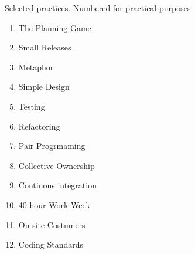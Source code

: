 Selected practices\citep{xp:explained}. Numbered for practical purposes

\begin{enumerate}
\item The Planning Game
\item Small Releases
\item Metaphor
\item Simple Design
\item Testing
\item Refactoring
\item Pair Progrmaming
\item Collective Ownership
\item Continous integration
\item 40-hour Work Week
\item On-site Costumers
\item Coding Standards
\end{enumerate}